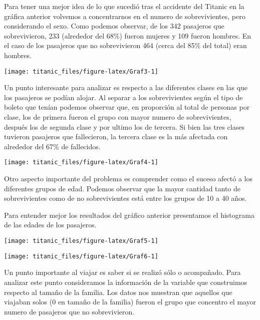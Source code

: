 \documentclass[
]{article}
\begin{document}
Para tener una mejor idea de lo que sucedió tras el accidente del
Titanic en la gráfica anterior volvemos a concentrarnos en el numero de
sobrevivientes, pero considerando el sexo. Como podemos observar, de los
342 pasajeros que sobrevivieron, 233 (alrededor del 68\%) fueron mujeres
y 109 fueron hombres. En el caso de los pasajeros que no sobrevivieron
464 (cerca del 85\% del total) eran hombres.

\begin{center}\texttt{[image: titanic\_files/figure-latex/Graf3-1]} \end{center}

Un punto interesante para analizar es respecto a las diferentes clases
en las que los pasajeros se podían alojar. Al separar a los
sobrevivientes según el tipo de boleto que tenían podemos observar que,
en proporción al total de personas por clase, los de primera fueron el
grupo con mayor numero de sobrevivientes, después los de segunda clase y
por ultimo los de tercera. Si bien las tres clases tuvieron pasajeros
que fallecieron, la tercera clase es la más afectada con alrededor del
67\% de fallecidos.

\begin{center}\texttt{[image: titanic\_files/figure-latex/Graf4-1]} \end{center}

Otro aspecto importante del problema es comprender como el suceso afectó
a los diferentes grupos de edad. Podemos observar que la mayor cantidad
tanto de sobrevivientes como de no sobrevivientes está entre los grupos
de 10 a 40 años.

Para entender mejor los resultados del gráfico anterior presentamos el
histograma de las edades de los pasajeros.

\begin{center}\texttt{[image: titanic\_files/figure-latex/Graf5-1]} \end{center}

\begin{center}\texttt{[image: titanic\_files/figure-latex/Graf6-1]} \end{center}

Un punto importante al viajar es saber si se realizó sólo o acompañado.
Para analizar este punto consideramos la información de la variable que
construimos respecto al tamaño de la familia. Los datos nos muestran que
aquellos que viajaban solos (0 en tamaño de la familia) fueron el grupo
que concentro el mayor numero de pasajeros que no sobrevivieron.
\end{document}
